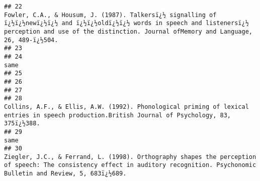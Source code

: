 \documentclass[
  english,
  man]{apa6}
\begin{document}
\begin{verbatim}
## 22                                                                                               Fowler, C.A., & Housum, J. (1987). Talkersï¿½ signalling of ï¿½ï¿½newï¿½ï¿½ and ï¿½ï¿½oldï¿½ï¿½ words in speech and listenersï¿½ perception and use of the distinction. Journal ofMemory and Language, 26, 489-ï¿½504.
## 23                                                                                                                                                                                                                                                                                                                     
## 24                                                                                                                                                                                                                                                                                                                 same
## 25                                                                                                                                                                                                                                                                                                                     
## 26                                                                                                                                                                                                                                                                                                                     
## 27                                                                                                                                                                                                                                                                                                                     
## 28                                                                                                                                                                      Collins, A.F., & Ellis, A.W. (1992). Phonological priming of lexical entries in speech production.British Journal of Psychology, 83, 375ï¿½388.
## 29                                                                                                                                                                                                                                                                                                                 same
## 30                                                                                                                                     Ziegler, J.C., & Ferrand, L. (1998). Orthography shapes the perception of speech: The consistency effect in auditory recognition. Psychonomic Bulletin and Review, 5, 683ï¿½689.

\end{verbatim}
\end{document}

